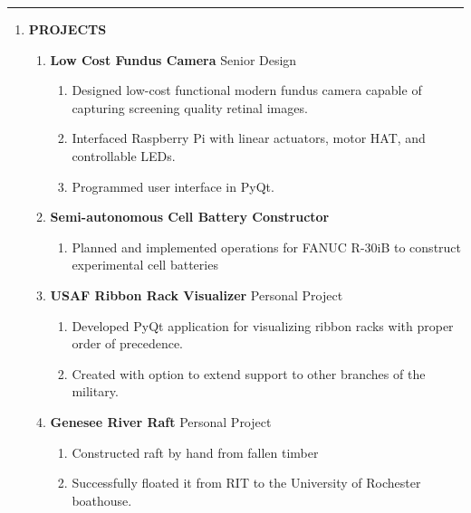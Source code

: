 \documentclass[11pt]{article}
\begin{document}
\textcolor{black!20}{\rule{\textwidth}{3pt}}
\begin{center}
\begin{enumerate}[label={}, leftmargin=0pt]
    \item {\Large \textbf{PROJECTS}}
    \begin{enumerate}[label={}]
        \item \textbf{Low Cost Fundus Camera} \textbar{} Senior Design
        \begin{enumerate}[label={--}]
            \item Designed low-cost functional modern fundus camera capable of capturing screening quality retinal images.
            \item Interfaced Raspberry Pi with linear actuators, motor HAT, and controllable LEDs.
            \item Programmed user interface in PyQt.
        \end{enumerate}
        \item \textbf{Semi-autonomous Cell Battery Constructor}
        \begin{enumerate}[label={--}]
            \item Planned and implemented operations for FANUC R-30iB to construct experimental cell batteries
        \end{enumerate}
        \item \textbf{USAF Ribbon Rack Visualizer} \textbar{} Personal Project
        \begin{enumerate}[label={--}]
            \item Developed PyQt application for visualizing ribbon racks with proper order of precedence.
            \item Created with option to extend support to other branches of the military.
        \end{enumerate}
        \item \textbf{Genesee River Raft} \textbar{} Personal Project
        \begin{enumerate}[label={--}]
            \item Constructed raft by hand from fallen timber
            \item Successfully floated it from RIT to the University of Rochester boathouse.
        \end{enumerate}
    \end{enumerate}
\end{enumerate}
\end{center}
\end{document}
